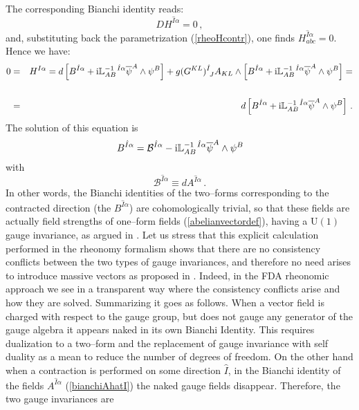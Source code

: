 \documentclass[a4paper,12pt]{article}
\def\bar{\overline}\end {picture}}
\begin{document}
The corresponding Bianchi identity reads:
\begin{equation}
DH^{\hat{I}\alpha}=0\,,
\end{equation}
and, substituting  back the parametrization (\ref{rheoHcontr}),
one finds
 $H^{\hat{I}\alpha}_{abc}=0$. Hence we have:
\begin{eqnarray}
0&=&H^{I\alpha}=d\left[B^{\hat{I}\alpha}+{\rm i}
\mathbb{L}^{-1~\hat{I}\alpha}_{AB}\bar{\psi}^A\wedge\psi^B\right]
+ g(G^{KL})^{\hat{I}}_{~J}A_{KL}\wedge
\left[B^{\hat{I}\alpha}+{\rm i}
\mathbb{L}^{-1~\hat{I}\alpha}_{AB}\bar{\psi}^A\wedge\psi^B\right] =\nonumber\\\nonumber\\
&=&d\left[B^{\hat{I}\alpha}+{\rm i}
\mathbb{L}^{-1~\hat{I}\alpha}_{AB}\bar{\psi}^A\wedge\psi^B\right]
\,. \label{bianchiAhatI}
\end{eqnarray}
The solution of this equation is
\begin{equation}
B^{\hat{I}\alpha}=\mathcal{B}^{\hat{I}\alpha}-{\rm i}
\mathbb{L}^{-1~\hat{I}\alpha}_{AB}\bar{\psi}^A\wedge\psi^B
\end{equation}
with
\begin{equation}
\mathcal{B}^{\hat{I}\alpha}\equiv dA^{\hat{I}\alpha}\,.
\label{abelianvectordef}
\end{equation}
In other words, the Bianchi identities of the two--forms
corresponding to the contracted direction (the
$B^{\hat{I}\alpha}$) are cohomologically trivial, so that these
fields are actually field strengths of one--form fields
(\ref{abelianvectordef}), having a $\mathrm{U(1)}$ gauge
invariance, as argued in \cite{gunwar}. Let us stress that this
explicit calculation performed in the rheonomy formalism shows
that there are no consistency conflicts between the two types of
gauge invariances, and therefore no need arises to introduce
massive vectors as proposed in \cite{gunwar}. Indeed,  in the FDA
rheonomic approach we  see in a transparent way where the
consistency conflicts arise and how they are solved. Summarizing
it goes as follows. When a vector field is charged with respect to
the gauge group, but does not gauge any generator of the gauge
algebra it appears naked in its own Bianchi Identity. This
requires dualization to a two--form and the replacement of gauge
invariance with self duality as a mean to reduce the number of
degrees of freedom. On the other hand  when a contraction is
performed on some direction $\hat{I}$, in the Bianchi identity of
the fields $A^{\hat{I}\alpha}$ (\ref{bianchiAhatI}) the naked
gauge fields disappear. Therefore, the two gauge invariances are
\end{document}
